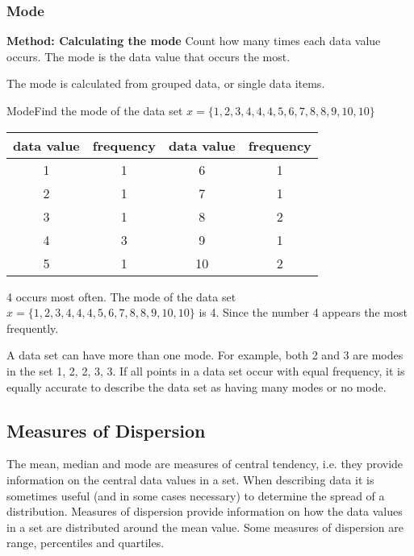 \documentclass[10pt,a4paper,titlepage,twoside,openright]{report}
\begin{document}
\subsubsection{Mode}


\textbf{Method: Calculating the mode}
Count how many times each data value occurs. The mode is the data value that occurs the most.

The mode is calculated from grouped data, or single data items.

\begin{wex}{Mode}{Find the mode of the data set $x=\{1, 2, 3, 4, 4, 4, 5, 6, 7, 8, 8, 9,10,10\}$}{
\begin{center}
\begin{center}
\begin{tabular}{|c|c||c|c|}\hline
data value & frequency & data value & frequency\\\hline\hline
1&1&6&1\\\hline
2&1&7&1\\\hline
3&1&8&2\\\hline
4&3&9&1\\\hline
5&1&10&2\\\hline
\end{tabular}
\end{center}
\end{center}

4 occurs most often.
The mode of the data set $x=\{1, 2, 3, 4, 4, 4, 5, 6, 7, 8, 8, 9,10,10\}$ is 4. Since the number 4 appears the most frequently.}
\end{wex}

A data set can have more than one mode. For example, both 2 and 3 are modes in the set {1, 2, 2, 3, 3}. If all points in a data set occur with equal frequency, it is equally accurate to describe the data set as having many modes or no mode.

\subsection{Measures of Dispersion}
The mean, median and mode are measures of central tendency, i.e. they provide information on the central data values in a set. When describing data it is sometimes useful (and in some cases necessary) to determine the spread of a distribution. Measures of dispersion provide information on how the data values in a set are distributed around the mean value. Some measures of dispersion are range, percentiles and quartiles.
\end{document}
